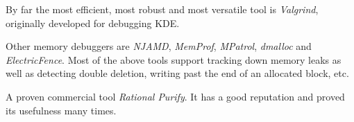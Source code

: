 By far the most efficient, most robust and most versatile tool
is \textit{Valgrind}, originally developed for debugging KDE.

Other memory debuggers are \textit{NJAMD}, \textit{MemProf},
\textit{MPatrol}, \textit{dmalloc} and \textit{ElectricFence}.
Most of the above tools support tracking down memory leaks as well as
detecting double deletion, writing past the end of an allocated block, etc.

A proven commercial tool \textit{Rational Purify}. It has
a good reputation and proved its usefulness many times.



%
%
%
%



